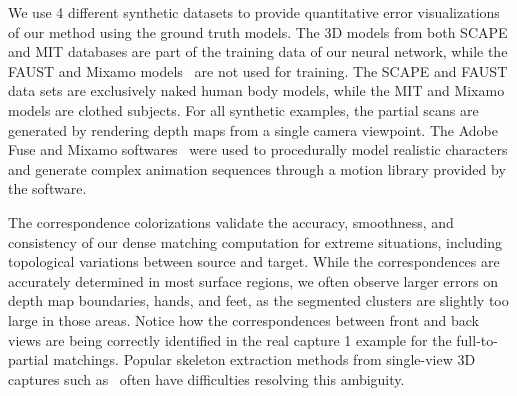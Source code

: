 \documentclass[10pt,twocolumn,letterpaper]{article}
\begin{document}
We use 4 different synthetic datasets to provide quantitative error visualizations of our method using the ground truth models. The 3D models from both SCAPE and MIT databases are part of the training data of our neural network, while the FAUST and Mixamo models~\cite{mixamo} are not used for training. The SCAPE and FAUST data sets are exclusively naked human body models, while the MIT and Mixamo models are clothed subjects. For all synthetic examples, the partial scans are generated by rendering depth maps from a single camera viewpoint. The Adobe Fuse and Mixamo softwares~\cite{mixamo} were used to procedurally model realistic characters and generate complex animation sequences through a motion library provided by the software. 

The correspondence colorizations validate the accuracy, smoothness, and consistency of our dense matching computation for extreme situations, including topological variations between source and target. 
While the correspondences are accurately determined in most surface regions, we often observe larger errors on depth map boundaries, hands, and feet, as the segmented clusters are slightly too large in those areas. Notice how the correspondences between front and back views are being correctly identified in the real capture 1 example for the full-to-partial matchings. Popular skeleton extraction methods from single-view 3D captures such as~\cite{shotton2012efficient,Wei2012accurate,tompson2014real} often have difficulties resolving this ambiguity.
 
\end{document}
